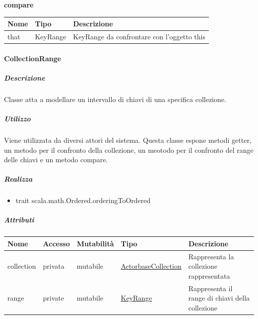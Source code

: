 \documentclass{scalatekids-article}
\begin{document}
\begin{center}
  \textbf{compare}\\
\end{center}
\begin{tabular}{| l | l | l |}
  \hline
  Nome & Tipo & Descrizione\\
  \hline
  that & KeyRange & KeyRange da confrontare con l'oggetto this \\
  \hline
\end{tabular}


\paragraph{CollectionRange}
\label{sec:actorbase::actorsystem::utils::CollectionRange}

\subparagraph{Descrizione}
Classe atta a modellare un intervallo di chiavi di una specifica collezione.

\subparagraph{Utilizzo}
Viene utilizzata da diversi attori del sistema. Questa classe espone metodi
getter, un metodo per il confronto della collezione, un meotodo per il
confronto del range delle chiavi e un metodo compare.

\subparagraph{Realizza}
\begin{itemize}
  \item trait scala.math.Ordered.orderingToOrdered
\end{itemize}

\subparagraph{Attributi}
\begin{tabular}{| p{3cm} | p{1.5cm} | p{2cm} | p{2cm} | p{8.5cm} |}
  \hline
  Nome & Accesso & Mutabilità & Tipo & Descrizione\\
  \hline
  collection & privata & mutabile & \hyperref[sec:actorbase::actorsystem::utils::ActorbaseCollection]{ActorbaseCollection} & Rappresenta la collezione rappresentata \\
  \hline
  range & private & mutabile & \hyperref[sec:actorbase::actorsystem::utils::KeyRange]{KeyRange} & Rappresenta il range di chiavi della collezione \\
  \hline
\end{tabular}
\end{document}
